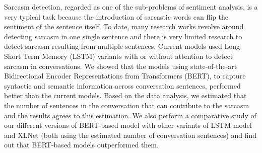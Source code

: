Sarcasm detection, regarded as one of the sub-problems of sentiment analysis, is a very typical task because the introduction of sarcastic words can flip the sentiment of the sentence itself. To date, many research works revolve around detecting sarcasm in one single sentence and there is very limited research to detect sarcasm resulting from multiple sentences. Current models used Long Short Term Memory (LSTM) variants with or without attention to detect sarcasm in conversations. We showed that the models using state-of-the-art Bidirectional Encoder Representations from Transformers (BERT), to capture syntactic and semantic information across conversation sentences, performed better than the current models. Based on the data analysis, we estimated that the number of sentences in the conversation that can contribute to the sarcasm and the results agrees to this estimation. We also perform a comparative study of our different versions of BERT-based model with other variants of LSTM model and XLNet (both using the estimated number of conversation sentences) and find out that BERT-based models outperformed them.
